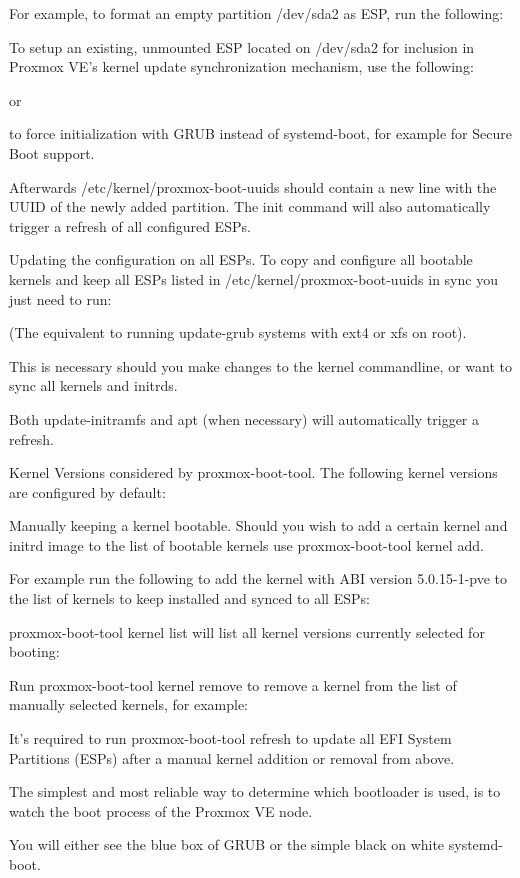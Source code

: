 For example, to format an empty partition /dev/sda2 as ESP, run the following:

To setup an existing, unmounted ESP located on /dev/sda2 for inclusion in Proxmox VE’s kernel update synchronization mechanism, use the following:

or

to force initialization with GRUB instead of systemd-boot, for example for Secure Boot support.

Afterwards /etc/kernel/proxmox-boot-uuids should contain a new line with the UUID of the newly added partition. The init command will also automatically trigger a refresh of all configured ESPs.

Updating the configuration on all ESPs. To copy and configure all bootable kernels and keep all ESPs listed in /etc/kernel/proxmox-boot-uuids in sync you just need to run:

(The equivalent to running update-grub systems with ext4 or xfs on root).

This is necessary should you make changes to the kernel commandline, or want to sync all kernels and initrds.

Both update-initramfs and apt (when necessary) will automatically trigger a refresh.

Kernel Versions considered by proxmox-boot-tool. The following kernel versions are configured by default:

Manually keeping a kernel bootable. Should you wish to add a certain kernel and initrd image to the list of bootable kernels use proxmox-boot-tool kernel add.

For example run the following to add the kernel with ABI version 5.0.15-1-pve to the list of kernels to keep installed and synced to all ESPs:

proxmox-boot-tool kernel list will list all kernel versions currently selected for booting:

Run proxmox-boot-tool kernel remove to remove a kernel from the list of manually selected kernels, for example:

It’s required to run proxmox-boot-tool refresh to update all EFI System Partitions (ESPs) after a manual kernel addition or removal from above.

The simplest and most reliable way to determine which bootloader is used, is to watch the boot process of the Proxmox VE node.

You will either see the blue box of GRUB or the simple black on white systemd-boot.

